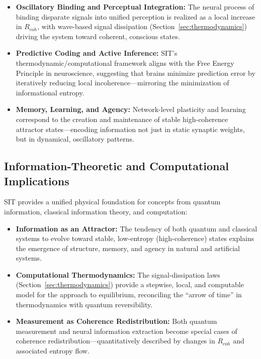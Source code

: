 \documentclass[american,11pt,letterpaper]{article}
\def\mathrm#1{#1}%
\begin{document}
\begin{itemize}
    \item \textbf{Oscillatory Binding and Perceptual Integration:}  
    The neural process of binding disparate signals into unified perception is realized as a local increase in $R_{\mathrm{coh}}$, with wave-based signal dissipation (Section~\ref{sec:thermodynamics}) driving the system toward coherent, conscious states.
    \item \textbf{Predictive Coding and Active Inference:}  
    SIT's thermodynamic/computational framework aligns with the Free Energy Principle in neuroscience, suggesting that brains minimize prediction error by iteratively reducing local incoherence---mirroring the minimization of informational entropy.
    \item \textbf{Memory, Learning, and Agency:}  
    Network-level plasticity and learning correspond to the creation and maintenance of stable high-coherence attractor states---encoding information not just in static synaptic weights, but in dynamical, oscillatory patterns.
\end{itemize}

\subsection{Information-Theoretic and Computational Implications}

SIT provides a unified physical foundation for concepts from quantum information, classical information theory, and computation:

\begin{itemize}
    \item \textbf{Information as an Attractor:}  
    The tendency of both quantum and classical systems to evolve toward stable, low-entropy (high-coherence) states explains the emergence of structure, memory, and agency in natural and artificial systems.
    \item \textbf{Computational Thermodynamics:}  
    The signal-dissipation laws (Section~\ref{sec:thermodynamics}) provide a stepwise, local, and computable model for the approach to equilibrium, reconciling the ``arrow of time'' in thermodynamics with quantum reversibility.
    \item \textbf{Measurement as Coherence Redistribution:}  
    Both quantum measurement and neural information extraction become special cases of coherence redistribution---quantitatively described by changes in $R_{\mathrm{coh}}$ and associated entropy flow.
\end{itemize}
\end{document}
